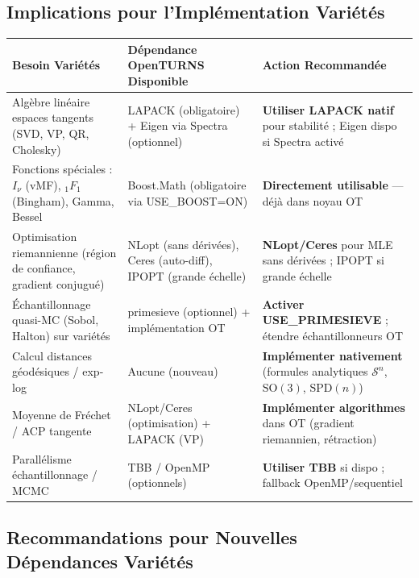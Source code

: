 \documentclass[11pt,a4paper]{article}
\begin{document}
\subsection{Implications pour l'Implémentation Variétés}

\begin{longtable}{@{}p{3.5cm}p{5.5cm}p{5cm}@{}}
\toprule
\textbf{Besoin Variétés} & \textbf{Dépendance OpenTURNS Disponible} & \textbf{Action Recommandée} \\
\midrule
Algèbre linéaire espaces tangents (SVD, VP, QR, Cholesky) & LAPACK (obligatoire) + Eigen via Spectra (optionnel) & \textbf{Utiliser LAPACK natif} pour stabilité ; Eigen dispo si Spectra activé \\
Fonctions spéciales : $I_\nu$ (vMF), ${}_1F_1$ (Bingham), Gamma, Bessel & Boost.Math (obligatoire via USE\_BOOST=ON) & \textbf{Directement utilisable} --- déjà dans noyau OT \\
Optimisation riemannienne (région de confiance, gradient conjugué) & NLopt (sans dérivées), Ceres (auto-diff), IPOPT (grande échelle) & \textbf{NLopt/Ceres} pour MLE sans dérivées ; IPOPT si grande échelle \\
Échantillonnage quasi-MC (Sobol, Halton) sur variétés & primesieve (optionnel) + implémentation OT & \textbf{Activer USE\_PRIMESIEVE} ; étendre échantillonneurs OT \\
Calcul distances géodésiques / exp-log & Aucune (nouveau) & \textbf{Implémenter nativement} (formules analytiques $\mathcal{S}^n$, $\text{SO}(3)$, $\text{SPD}(n)$) \\
Moyenne de Fréchet / ACP tangente & NLopt/Ceres (optimisation) + LAPACK (VP) & \textbf{Implémenter algorithmes} dans OT (gradient riemannien, rétraction) \\
Parallélisme échantillonnage / MCMC & TBB / OpenMP (optionnels) & \textbf{Utiliser TBB} si dispo ; fallback OpenMP/sequentiel \\
\bottomrule
\end{longtable}

\subsection{Recommandations pour Nouvelles Dépendances Variétés}
\end{document}
